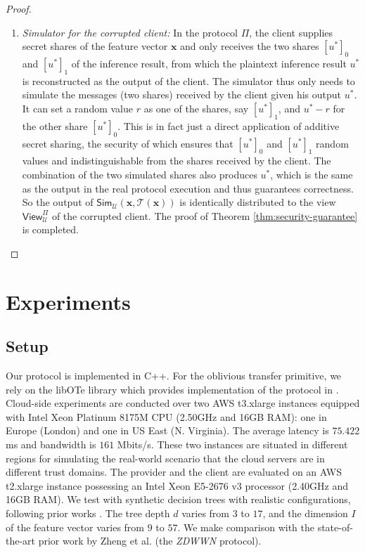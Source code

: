 \documentclass[10pt,journal,compsoc]{IEEEtran}
\begin{document}
\begin{proof}
\begin{enumerate}[-]
\item \emph{Simulator for the corrupted client:}
%
In the protocol $\Pi$, the client supplies secret shares of the feature vector $\mathbf{x}$ and only receives the two shares $[u^*]_0$ and $[u^*]_1$ of the inference result, from which the plaintext inference result $u^*$ is reconstructed as the output of the client.
%
The simulator thus only needs to simulate the messages (two shares) received by the client given his output $u^*$.
%
It can set a random value $r$ as one of the shares, say $[u^*]_1$, and $u^*-r$ for the other share $[u^*]_0$.
%
This is in fact just a direct application of additive secret sharing, the security of which ensures that $[u^*]_0$ and $[u^*]_1$ random values and indistinguishable from the shares received by the client.
%
%
The combination of the two simulated shares also produces $u^*$, which is the same as the output in the real protocol execution and thus guarantees correctness.
% 
So the output of $\mathsf{Sim}_{\mathcal{U}}(\mathbf{x},\mathcal{T}(\mathbf{x}))$ is identically distributed to the view $\mathsf{View}^{\Pi}_{\mathcal{U}}$ of the corrupted client.
%
The proof of Theorem \ref{thm:security-guarantee} is completed.


\end{enumerate}


\end{proof}







\section{Experiments}
\label{sec:experiments}
\subsection{Setup}

Our protocol is implemented in C++.
%
For the oblivious transfer primitive, we rely on the libOTe library \cite{libOTe} which provides implementation of the protocol in \cite{KolesnikovKRT16}.
%
Cloud-side experiments are conducted over two AWS t3.xlarge instances equipped with Intel Xeon Platinum 8175M CPU (2.50GHz and 16GB RAM): one in Europe (London) and one in US East (N. Virginia).
%
The average latency is $75.422$ ms and bandwidth is $161$ Mbits/s.
%
These two instances are situated in different regions for simulating the real-world scenario that the cloud servers are in different trust domains. 
%
%
%
The provider and the client are evaluated on an AWS t2.xlarge instance possessing an Intel Xeon E5-2676 v3 processor (2.40GHz and 16GB RAM).
%
We test with synthetic decision trees with realistic configurations, following prior works \cite{DWuFNL16,TaiMZC17,ZhengDWWN20}. 
%
The tree depth $d$ varies from $3$ to $17$, and the dimension $I$ of the feature vector varies from $9$ to $57$. 
%
We make comparison with the state-of-the-art prior work by Zheng et al. \cite{ZhengDWWN20} (the \emph{ZDWWN} protocol).
\end{document}
